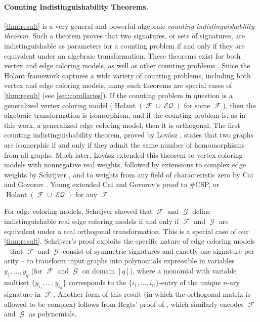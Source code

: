 \documentclass{article}
\theoremstyle{remark}
\theoremstyle{definition}
\DeclareMathOperator{\fc}{\mathcal{F}}
\DeclareMathOperator{\gc}{\mathcal{G}}
\DeclareMathOperator{\holant}{Holant}
\DeclareMathOperator{\eq}{\mathcal{EQ}}
\begin{document}
\paragraph{Counting Indistinguishability Theorems.}
\autoref{thm:result} is a very general and powerful algebraic 
\emph{counting indistinguishability theorem}. 
Such a theorem proves that two signatures, or sets of signatures, are indistinguishable
as parameters for a counting problem if and only if they are equivalent under an algebraic
transformation. These theorems exist for both vertex and edge coloring models, as well as other
counting problems \cite{dell, grohe_homomorphism_2022, dvorak_recognizing_2010}.
Since the Holant framework captures a wide variety of counting problems,
including both vertex and edge coloring models, many such theorems are special cases
of \autoref{thm:result} (see \autoref{sec:corollaries}).
If the counting problem in question is a generalized vertex coloring model ($\holant(\fc \cup \eq)$
for some $\fc$), then the algebraic transformation is isomorphism, and if the counting problem is,
as in this work, a generalized edge coloring model, then it is orthogonal.
The first counting indistinguishability theorem, proved by Lov\'{a}sz \cite{lovasz_operations}, 
states that two graphs are
isomorphic if and only if they admit the same number of homomorphisms from all graphs. Much later,
Lov\'{a}sz \cite{lovasz} extended this theorem to vertex coloring models with nonnegative real 
weights, followed by extensions to complex edge weights by Schrijver 
\cite{schrijver}, and to weights from any field of characteristic zero by Cai and Govorov 
\cite{cai-lovasz}. Young \cite{young2022equality} extended Cai and Govorov's proof to \#CSP, or
$\holant(\fc \cup \eq)$ for any $\fc$. 

For edge coloring models, Schrijver \cite{schrijver_graph_2008} showed that 
$\fc$ and $\gc$ define indistinguishable real edge coloring models if and only if
$\fc$ and $\gc$ are equivalent under a real orthogonal transformation. 
This is a special case of our \autoref{thm:result}.
Schrijver's proof exploits the specific nature of edge coloring models -- that $\fc$ and $\gc$ consist
of symmetric signatures and exactly one signature per arity -- to transform input graphs into polynomials
expressible in variables $y_1,\ldots,y_q$ (for $\fc$ and $\gc$ on domain $[q]$), 
where a monomial with variable multiset $\{y_{i_1},\ldots, y_{i_n}\}$ corresponds to the
$\{i_1,\ldots,i_n\}$-entry of the unique $n$-ary signature in $\fc$.
Another form of this result (in which the orthogonal matrix is allowed to be complex) 
follows from Regts' proof of 
\cite[Lemma 5]{regts_characterization_2013}, which similarly encodes $\fc$ and $\gc$ as polynomials.
\end{document}
